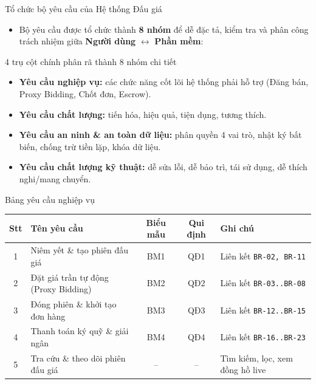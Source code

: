 \documentclass[aspectratio=169, 10pt]{beamer}
\begin{document}
\begin{frame}{Tổ chức bộ yêu cầu của Hệ thống Đấu giá}
    \begin{itemize}
        \item Bộ yêu cầu được tổ chức thành \textbf{8 nhóm} để dễ đặc tả, kiểm tra và phân công trách nhiệm giữa \textbf{Người dùng} $\leftrightarrow$ \textbf{Phần mềm}:
    \end{itemize}
    \vspace{0.3cm}
    \begin{block}{4 trụ cột chính phân rã thành 8 nhóm chi tiết}
        \begin{itemize}
            \item \textbf{Yêu cầu nghiệp vụ:} các chức năng cốt lõi hệ thống phải hỗ trợ (Đăng bán, Proxy Bidding, Chốt đơn, Escrow).
            \item \textbf{Yêu cầu chất lượng:} tiến hóa, hiệu quả, tiện dụng, tương thích.
            \item \textbf{Yêu cầu an ninh \& an toàn dữ liệu:} phân quyền 4 vai trò, nhật ký bất biến, chống trừ tiền lặp, khóa dữ liệu.
            \item \textbf{Yêu cầu chất lượng kỹ thuật:} dễ sửa lỗi, dễ bảo trì, tái sử dụng, dễ thích nghi/mang chuyển.
        \end{itemize}
    \end{block}
\end{frame}

\begin{frame}{Bảng yêu cầu nghiệp vụ}
    \footnotesize
    \begin{table}[h]
        \centering
        \begin{tabular}{c l c c p{4.2cm}}
            \toprule
            \textbf{Stt} & \textbf{Tên yêu cầu} & \textbf{Biểu mẫu} & \textbf{Qui định} & \textbf{Ghi chú} \\
            \midrule
            1 & Niêm yết \& tạo phiên đấu giá & BM1 & QĐ1 & Liên kết \texttt{BR-02, BR-11} \\
            \midrule
            2 & Đặt giá trần tự động (Proxy Bidding) & BM2 & QĐ2 & Liên kết \texttt{BR-03..BR-08} \\
            \midrule
            3 & Đóng phiên \& khởi tạo đơn hàng & BM3 & QĐ3 & Liên kết \texttt{BR-12..BR-15} \\
            \midrule
            4 & Thanh toán ký quỹ \& giải ngân & BM4 & QĐ4 & Liên kết \texttt{BR-16..BR-23} \\
            \midrule
            5 & Tra cứu \& theo dõi phiên đấu giá & -- & -- & Tìm kiếm, lọc, xem đồng hồ live \\
            \bottomrule
        \end{tabular}
    \end{table}
\end{frame}
\end{document}
